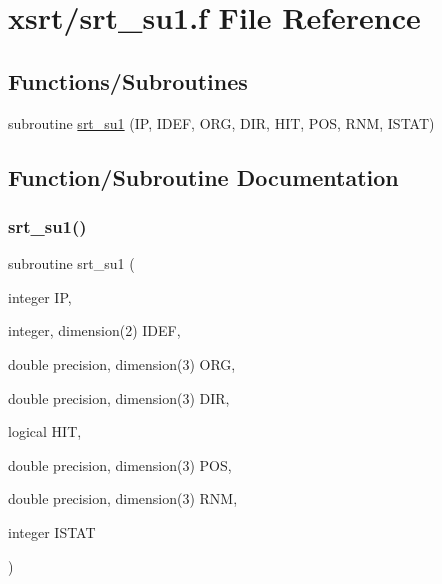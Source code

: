 \hypertarget{srt__su1_8f}{}\section{xsrt/srt\+\_\+su1.f File Reference}
\label{srt__su1_8f}
\subsection*{Functions/\+Subroutines}
\begin{DoxyCompactItemize}
\item 
subroutine \hyperlink{srt__su1_8f_a2927934c37e38612080021d3cb31bb2c}{srt\+\_\+su1} (IP, I\+D\+EF, O\+RG, D\+IR, H\+IT, P\+OS, R\+NM, I\+S\+T\+AT)
\end{DoxyCompactItemize}


\subsection{Function/\+Subroutine Documentation}
\mbox{\label{srt__su1_8f_a2927934c37e38612080021d3cb31bb2c}} 
\subsubsection{\texorpdfstring{srt\+\_\+su1()}{srt\_su1()}}
{\footnotesize\ttfamily subroutine srt\+\_\+su1 (\begin{DoxyParamCaption}\item[{integer}]{IP,  }\item[{integer, dimension(2)}]{I\+D\+EF,  }\item[{double precision, dimension(3)}]{O\+RG,  }\item[{double precision, dimension(3)}]{D\+IR,  }\item[{logical}]{H\+IT,  }\item[{double precision, dimension(3)}]{P\+OS,  }\item[{double precision, dimension(3)}]{R\+NM,  }\item[{integer}]{I\+S\+T\+AT }\end{DoxyParamCaption})}

